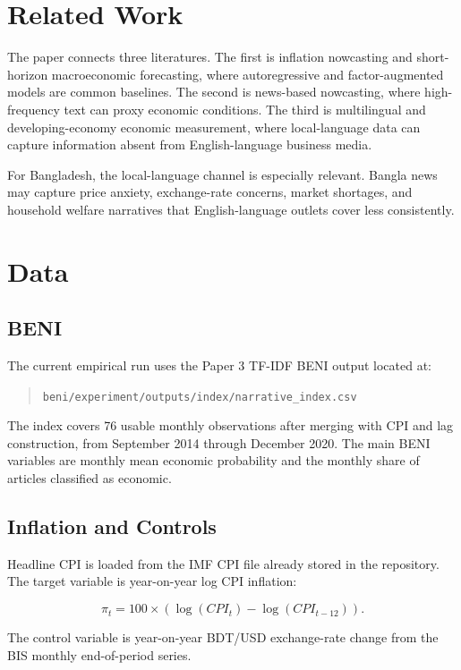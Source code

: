 \documentclass[11pt]{article}
\begin{document}
\section{Related Work}

The paper connects three literatures. The first is inflation nowcasting and short-horizon macroeconomic forecasting, where autoregressive and factor-augmented models are common baselines. The second is news-based nowcasting, where high-frequency text can proxy economic conditions. The third is multilingual and developing-economy economic measurement, where local-language data can capture information absent from English-language business media.

For Bangladesh, the local-language channel is especially relevant. Bangla news may capture price anxiety, exchange-rate concerns, market shortages, and household welfare narratives that English-language outlets cover less consistently.

\section{Data}

\subsection{BENI}

The current empirical run uses the Paper 3 TF-IDF BENI output located at:

\begin{quote}
\texttt{beni/experiment/outputs/index/narrative\_index.csv}
\end{quote}

The index covers 76 usable monthly observations after merging with CPI and lag construction, from September 2014 through December 2020. The main BENI variables are monthly mean economic probability and the monthly share of articles classified as economic.

\subsection{Inflation and Controls}

Headline CPI is loaded from the IMF CPI file already stored in the repository. The target variable is year-on-year log CPI inflation:

\[
\pi_t = 100 \times \left(\log(CPI_t) - \log(CPI_{t-12})\right).
\]

The control variable is year-on-year BDT/USD exchange-rate change from the BIS monthly end-of-period series.
\end{document}
